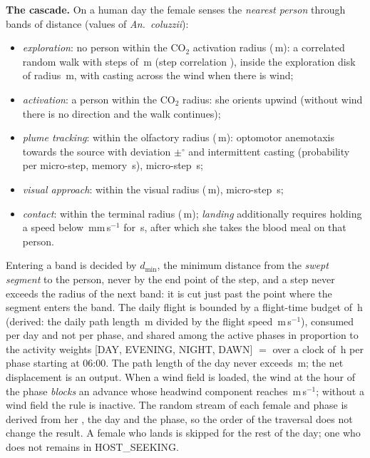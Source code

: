 \documentclass[11pt,a4paper]{article}
\newcommand{\code}[1]{\path{#1}}
\begin{document}
\textbf{The cascade.} On a human day the female senses the \emph{nearest person}
through bands of distance (values of \emph{An.\ coluzzii}):
\begin{itemize}
\item \emph{exploration}: no person within the CO$_2$ activation radius
  (\,m): a correlated random walk
  with steps of \,m (step correlation ),
  inside the exploration disk of radius \,m, with casting across the wind when
  there is wind;
\item \emph{activation}: a person within the CO$_2$ radius: she orients upwind
  (without wind there is no direction and the walk continues);
\item \emph{plume tracking}: within the olfactory radius
  (\,m): optomotor anemotaxis towards the source with deviation $\pm$$^\circ$ and
  intermittent casting (probability  per micro-step, memory \,s), micro-step
  \,s;
\item \emph{visual approach}: within the visual radius
  (\,m), micro-step \,s;
\item \emph{contact}: within the terminal radius
  (\,m); \emph{landing} additionally requires holding a speed below
  \,mm\,s$^{-1}$ for \,s, after which she takes the blood meal on that person.
\end{itemize}
Entering a band is decided by $d_{\min}$, the minimum distance from the
\emph{swept segment} to the person, never by the end point of the step, and a
step never exceeds the radius of the next band: it is cut just past the point
where the segment enters the band. The daily flight is bounded by a flight-time budget of
\,h (derived: the daily path length
\,m divided by the flight speed
\,m\,s$^{-1}$), consumed per day and not per phase, and shared among the active phases in proportion to the
activity weights [DAY, EVENING, NIGHT, DAWN] $=$ 
over a clock of \,h per phase starting at 06:00. The path length of the day never exceeds
\,m; the net displacement is an output. When a wind field is loaded, the wind at the hour of the phase
\emph{blocks} an advance whose headwind component reaches
\,m\,s$^{-1}$; without a wind field the rule is inactive. The random stream of each female and phase is derived from her
\code{uid}, the day and the phase, so the order of the traversal does not
change the result. A female who lands is skipped for the rest of the day; one who does not remains
in HOST\_SEEKING.
\end{document}
